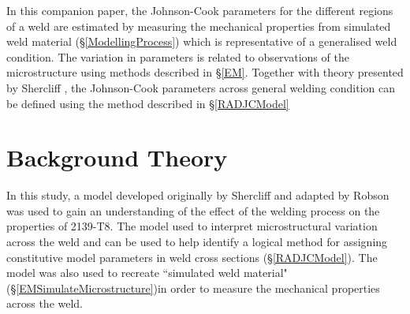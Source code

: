 	In this companion paper, the Johnson-Cook parameters for the different regions of a weld are estimated by measuring the mechanical properties from simulated weld material (\S\ref{ModellingProcess}) which is representative of a generalised weld condition. The variation in parameters is related to observations of the microstructure using methods described in \S\ref{EM}. Together with theory presented by Shercliff \cite{Shercliff1990,Shercliff1990a}, the Johnson-Cook parameters across general welding condition can be defined using the method described in \S\ref{RADJCModel} 
	\section{Background Theory}
	\label{Modelling}
	In this study, a model developed originally by Shercliff \cite{Shercliff1990,Shercliff1990a} and adapted by Robson \cite{Robson2006a} was used to gain an understanding of the effect of the welding process on the properties of 2139-T8. The model used to interpret microstructural variation across the weld and can be used to help identify a logical method for assigning constitutive model parameters in weld cross sections (\S\ref{RADJCModel}). The model was also used to recreate ``simulated weld material" (\S\ref{EMSimulateMicrostructure})in order to measure the mechanical properties across the weld. 
